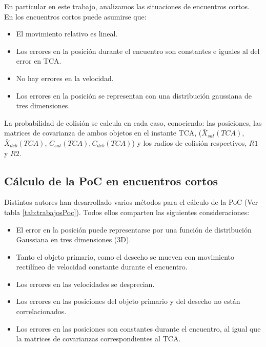 {En particular en este trabajo, analizamos las situaciones de encuentros cortos.\\
En los encuentros cortos puede asumirse que:\\

\begin{itemize}
\itemsep0em
 \item El movimiento relativo es lineal.
 \item Los errores en la posici\'on durante el encuentro son constantes e iguales al del error en TCA.
 \item No hay errores en la velocidad.
 \item Los errores en la posici\'on se representan con una distribuci\'on gaussiana de tres dimensiones.
\end{itemize}

La probabilidad de colisi\'on se calcula en cada caso, conociendo: las posiciones, las matrices de covarianza de ambos objetos en el instante TCA, ($\bar{X}_{sat}(TCA)$, $\bar{X}_{deb}(TCA)$, $C_{sat}(TCA), C_{deb}(TCA)$) y los radios de colisi\'on respectivos, $R1$ y $R2$.

\subsection*{C\'alculo de la PoC en encuentros cortos}

Distintos autores han desarrollado varios m\'etodos para el c\'alculo de la PoC (Ver tabla \ref{tab:trabajosPoc}). Todos ellos comparten las siguientes consideraciones:\\
\begin{itemize}
\itemsep0em
\item El error en la posici\'on puede representarse por una funci\'on de distribuci\'on Gaussiana en tres dimensiones (3D).
\item Tanto el objeto primario, como el desecho se mueven con movimiento rectil\'ineo de velocidad constante durante el encuentro.
\item Los errores en las velocidades se desprecian.
\item Los errores en las posiciones del objeto primario y del desecho no est\'an correlacionados.
\item Los errores en las posiciones son constantes durante el encuentro, al igual que la matrices de covarianzas correspondientes al TCA.
\end{itemize}

}

